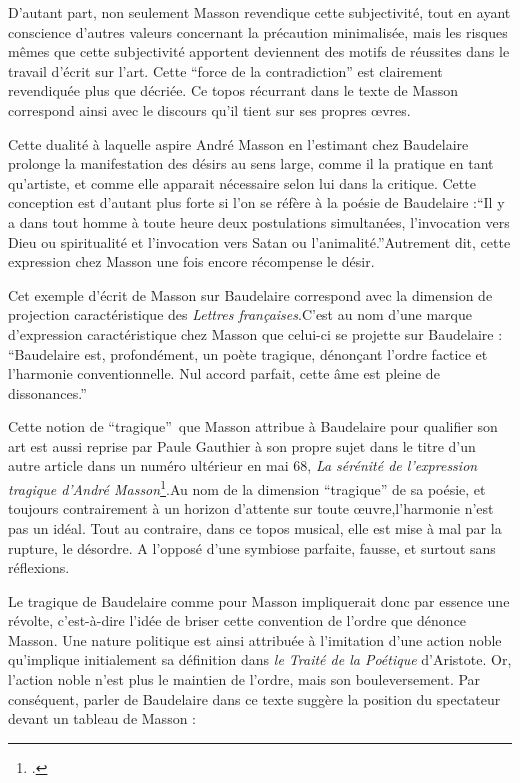 	D’autant part, non seulement Masson revendique cette subjectivité, tout en ayant conscience d’autres valeurs concernant la précaution minimalisée, mais les risques mêmes que cette subjectivité apportent deviennent des motifs de réussites dans le travail d’écrit sur l’art. Cette \enquote{force de la contradiction} est clairement revendiquée plus que décriée. Ce topos récurrant dans le texte de Masson correspond ainsi avec le discours qu'il tient sur ses propres \oe{}vres.

Cette dualité à laquelle aspire André Masson en l’estimant chez Baudelaire prolonge la manifestation des désirs au sens large, comme il la pratique en tant qu’artiste, et comme elle apparait nécessaire selon lui dans la critique. Cette conception est d’autant plus forte si l’on se réfère à la poésie de Baudelaire :\enquote{Il y a dans tout homme à toute heure deux postulations simultanées, l’invocation vers Dieu ou spiritualité et l’invocation vers Satan ou l’animalité.}Autrement dit, cette expression chez Masson une fois encore récompense le désir. 

	Cet exemple d'écrit de Masson sur Baudelaire correspond avec la dimension de projection caractéristique des \emph{Lettres françaises}.C’est au nom d’une marque d’expression caractéristique chez Masson que celui-ci se projette sur Baudelaire : \enquote{Baudelaire est, profondément, un poète tragique, dénonçant l’ordre factice et l’harmonie conventionnelle. Nul accord parfait, cette âme est pleine de dissonances.} 

Cette notion de \enquote{tragique} que Masson attribue à Baudelaire pour qualifier son art est aussi reprise par Paule Gauthier à son propre sujet dans le titre d’un autre article dans un numéro ultérieur en mai 68, \emph{La sérénité de l’expression tragique d’André Masson}\footcite{expressiontragique}.Au nom de la dimension \enquote{tragique} de sa poésie, et toujours contrairement à un horizon d’attente sur toute \oe{}uvre,l’harmonie n’est pas un idéal. Tout au contraire, dans ce topos musical, elle est mise à mal par la rupture, le désordre. A l’opposé d’une symbiose parfaite, fausse, et surtout sans réflexions. 


	
 Le tragique de Baudelaire comme pour Masson impliquerait donc par essence une révolte, c’est-à-dire l’idée de briser cette convention de l’ordre que dénonce Masson. Une nature politique est ainsi attribuée à l’imitation d’une action noble qu’implique initialement sa définition dans \emph{le Traité de la Poétique} d’Aristote. Or, l’action noble n’est plus le maintien de l’ordre, mais son bouleversement. Par conséquent, parler de Baudelaire dans ce texte suggère la position du spectateur devant un tableau de Masson : 

